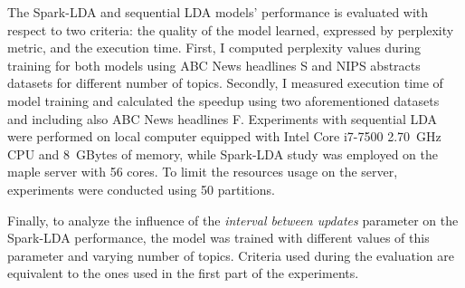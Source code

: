 \documentclass[journal]{IEEEtran}
\begin{document}
The Spark-LDA and sequential LDA models' performance is evaluated with respect to two criteria: the quality of the model learned, expressed by perplexity metric\cite{blei2003latent}, and the execution time. First, I computed perplexity values during training for both models using ABC News headlines S and NIPS abstracts datasets for different number of topics. Secondly, I measured execution time of model training and calculated the speedup using two aforementioned datasets and including also ABC News headlines F. Experiments with sequential LDA were performed on local computer equipped with Intel Core i7-7500 2.70~GHz CPU and 8~GBytes of memory, while Spark-LDA study was employed on the maple server with 56 cores. To limit the resources usage on the server, experiments were conducted using 50 partitions.

Finally, to analyze the influence of the \textit{interval between updates} parameter on the Spark-LDA performance, the model was trained with different values of this parameter and varying number of topics. Criteria used during the evaluation are 
equivalent to the ones used in the first part of the experiments.
\end{document}
